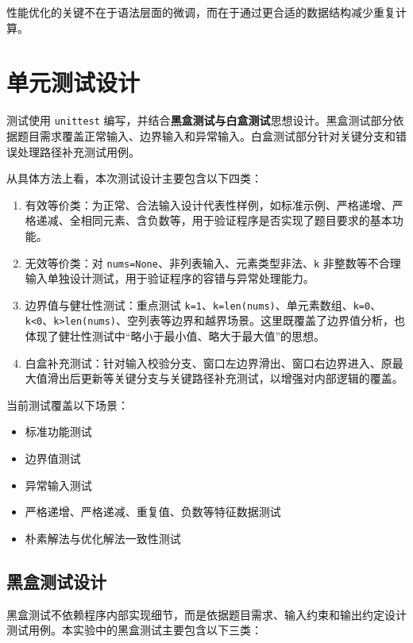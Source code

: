 \documentclass[a4paper,UTF8,fontset=none]{ctexart}
\begin{document}
性能优化的关键不在于语法层面的微调，而在于通过更合适的数据结构减少重复计算。

\section{单元测试设计}

测试使用 \texttt{unittest} 编写，并结合\textbf{黑盒测试与白盒测试}思想设计。黑盒测试部分依据题目需求覆盖正常输入、边界输入和异常输入。白盒测试部分针对关键分支和错误处理路径补充测试用例。

从具体方法上看，本次测试设计主要包含以下四类：

\begin{enumerate}
    \item 有效等价类：为正常、合法输入设计代表性样例，如标准示例、严格递增、严格递减、全相同元素、含负数等，用于验证程序是否实现了题目要求的基本功能。
    \item 无效等价类：对 \texttt{nums=None}、非列表输入、元素类型非法、\texttt{k} 非整数等不合理输入单独设计测试，用于验证程序的容错与异常处理能力。
    \item 边界值与健壮性测试：重点测试 \texttt{k=1}、\texttt{k=len(nums)}、单元素数组、\texttt{k=0}、\texttt{k<0}、\texttt{k>len(nums)}、空列表等边界和越界场景。这里既覆盖了边界值分析，也体现了健壮性测试中“略小于最小值、略大于最大值”的思想。
    \item 白盒补充测试：针对输入校验分支、窗口左边界滑出、窗口右边界进入、原最大值滑出后更新等关键分支与关键路径补充测试，以增强对内部逻辑的覆盖。
\end{enumerate}

当前测试覆盖以下场景：

\begin{itemize}
    \item 标准功能测试
    \item 边界值测试
    \item 异常输入测试
    \item 严格递增、严格递减、重复值、负数等特征数据测试
    \item 朴素解法与优化解法一致性测试
\end{itemize}

\subsection{黑盒测试设计}

黑盒测试不依赖程序内部实现细节，而是依据题目需求、输入约束和输出约定设计测试用例。本实验中的黑盒测试主要包含以下三类：
\end{document}

